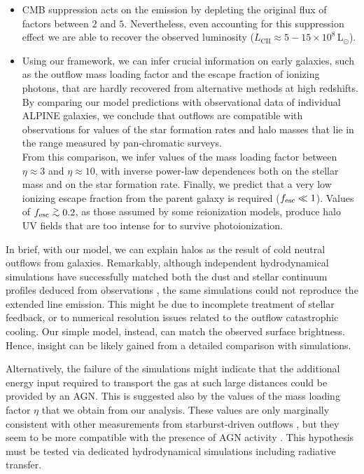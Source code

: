 \begin{itemize}
    \item CMB suppression acts on the \CII emission by depleting the original \CII flux of factors between $2$ and $5$. Nevertheless, even accounting for this suppression effect we are able to recover the observed \CII luminosity ($L_\mathrm{CII}\approx 5-15\times10^8\,\mathrm{L}_\odot$).
    \item  Using our framework, we can infer crucial information on early galaxies, such as the outflow mass loading factor and the escape fraction of ionizing photons, that are hardly recovered from alternative methods at high redshifts. 
    \\By comparing our model predictions with observational data of individual ALPINE galaxies, we conclude that outflows are compatible with observations for values of the star formation rates and halo masses that lie in the range measured by pan-chromatic surveys.
    \\From this comparison, we infer values of the mass loading factor between $\eta\approx3$ and $\eta\approx10$, with inverse power-law dependences both on the stellar mass and on the star formation rate. Finally, we predict that a very low ionizing escape fraction from the parent galaxy is required ($f_{\rm esc} \ll 1$). Values of $\fesc \gsim 0.2$, as those assumed by some reionization models, produce halo UV fields that are too intense for \CII to survive photoionization. 
\end{itemize} 

In brief, with our model, we can explain \CII halos as the result of cold neutral outflows from galaxies. Remarkably, although independent hydrodynamical simulations \citep{pallottini2017b, Arata:2019} have successfully matched both the dust and stellar continuum profiles deduced from observations \citep{Fujimoto19}, the same simulations could not reproduce the extended \CII line emission. This might be due to incomplete treatment of stellar feedback, or to numerical resolution issues related to the outflow catastrophic cooling. Our simple model, instead, can match the observed surface brightness. Hence, insight can be likely gained from a detailed comparison with simulations.

Alternatively, the failure of the simulations might indicate that the additional energy input required to transport the gas at such large distances could be provided by an AGN. This is suggested also by the values of the mass loading factor $\eta$ that we obtain from our analysis. These values are only marginally consistent with other measurements from starburst-driven outflows \citep{muratov2015, zhang2021empirical}, but they seem to be more compatible with the presence of AGN activity \citep[e.g.,][]{Fiore_2017}. This hypothesis must be tested via dedicated hydrodynamical simulations including radiative transfer.

